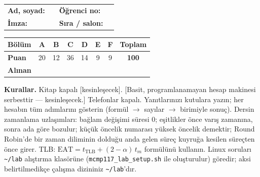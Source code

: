 \begin{center}
\renewcommand{\arraystretch}{1.6}
\begin{tabularx}{\linewidth}{@{}lX lX@{}}
\textbf{Ad, soyad:} & \hrulefill & \textbf{Öğrenci no:} & \hrulefill \\
\textbf{İmza:} & \hrulefill & \textbf{Sıra / salon:} & \hrulefill \\
\end{tabularx}

\vspace{0.4em}
\renewcommand{\arraystretch}{1.35}
\begin{tabular}{|l|c|c|c|c|c|c|c|}
\hline
\textbf{Bölüm} & A & B & C & D & E & F & \textbf{Toplam} \\ \hline
\textbf{Puan} & 20 & 12 & 36 & 14 & 9 & 9 & \textbf{100} \\ \hline
\textbf{Alınan} & & & & & & & \\[0.4em] \hline
\end{tabular}
\end{center}

\textbf{Kurallar.} Kitap kapalı [kesinleşecek]. [Basit, programlanamayan hesap makinesi serbesttir --- kesinleşecek.] Telefonlar kapalı. Yanıtlarınızı kutulara yazın; her hesabın tüm adımlarını gösterin (formül $\to$ sayılar $\to$ birimiyle sonuç). Dersin zamanlama uzlaşımları: bağlam değişimi süresi $0$; eşitlikler önce varış zamanına, sonra ada göre bozulur; küçük öncelik numarası yüksek öncelik demektir; Round Robin'de bir zaman diliminin dolduğu anda gelen süreç kuyruğa kesilen süreçten önce girer. TLB: $\text{EAT} = t_{\text{TLB}} + (2-\alpha)\,t_m$ formülünü kullanın. Linux soruları \texttt{\textasciitilde/lab} alıştırma klasörüne (\texttt{mcmp117\_lab\_setup.sh} ile oluşturulur) göredir; aksi belirtilmedikçe çalışma dizininiz \texttt{\textasciitilde/lab}'dır.

